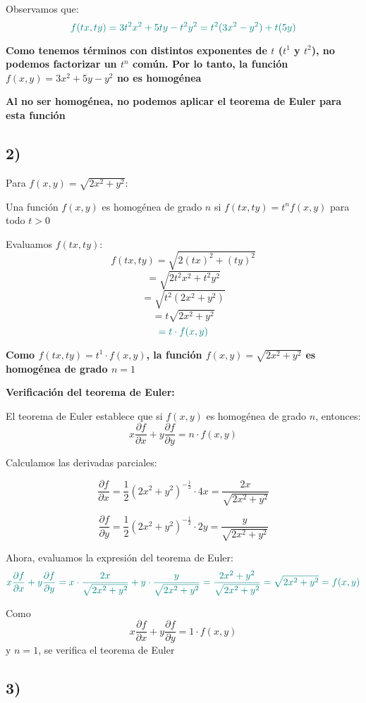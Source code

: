 \documentclass{article}
\begin{document}
Observamos que:
\[
\color{teal}
f(tx,ty) = 3t^2x^2 + 5ty - t^2y^2
= t^2(3x^2 - y^2) + t(5y)
\]

\textbf{\color{teal}Como tenemos términos con distintos exponentes de \(t\) (\(t^1\) y \(t^2\)), no podemos factorizar un \(t^n\) común. Por lo tanto, la función \(f(x,y) = 3x^2 + 5y - y^2\) no es homogénea}

\textbf{\color{teal}Al no ser homogénea, no podemos aplicar el teorema de Euler para esta función}

\subsection*{2)}

Para \(f(x,y) = \sqrt{2x^2 + y^2}\):

Una función \(f(x,y)\) es homogénea de grado \(n\) si \(f(tx,ty) = t^n f(x,y)\) para todo \(t > 0\)

Evaluamos \(f(tx,ty)\):
\[
f(tx,ty) = \sqrt{2(tx)^2 + (ty)^2}
\]
\[
= \sqrt{2t^2x^2 + t^2y^2}
\]
\[
= \sqrt{t^2(2x^2 + y^2)}
\]
\[
= t\sqrt{2x^2 + y^2}
\]
\[
\color{teal}
= t \cdot f(x,y)
\]

\textbf{\color{teal}Como \(f(tx,ty) = t^1 \cdot f(x,y)\), la función \(f(x,y) = \sqrt{2x^2 + y^2}\) es homogénea de grado \(n = 1\)}

\textbf{Verificación del teorema de Euler:}

El teorema de Euler establece que si \(f(x,y)\) es homogénea de grado \(n\), entonces:
\[
x\frac{\partial f}{\partial x} + y\frac{\partial f}{\partial y} = n \cdot f(x,y)
\]

Calculamos las derivadas parciales:

\[
\frac{\partial f}{\partial x} = \frac{1}{2}(2x^2 + y^2)^{-\frac{1}{2}} \cdot 4x = \frac{2x}{\sqrt{2x^2 + y^2}}
\]

\[
\frac{\partial f}{\partial y} = \frac{1}{2}(2x^2 + y^2)^{-\frac{1}{2}} \cdot 2y = \frac{y}{\sqrt{2x^2 + y^2}}
\]

Ahora, evaluamos la expresión del teorema de Euler:
\[
\color{teal}
x\frac{\partial f}{\partial x} + y\frac{\partial f}{\partial y}
= x \cdot \frac{2x}{\sqrt{2x^2 + y^2}} + y \cdot \frac{y}{\sqrt{2x^2 + y^2}}
= \frac{2x^2 + y^2}{\sqrt{2x^2 + y^2}}
= \sqrt{2x^2 + y^2}
= f(x,y)
\]

Como
\[
x\frac{\partial f}{\partial x} + y\frac{\partial f}{\partial y} = 1\cdot f(x,y)
\]
y \(n = 1\), se verifica el teorema de Euler
\subsection*{3)}
\end{document}
